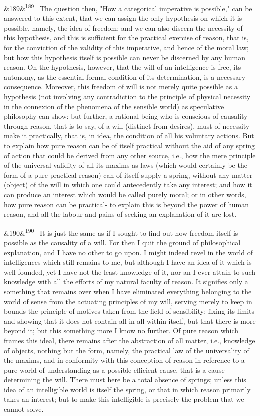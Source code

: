 \documentclass[12pt]{article}
\newcommand{\para}[1][]{\par\noindent\ifx&#1&\else\textsuperscript{\footnotesize #1}~\fi}
\begin{document}
\para[189] The question then, "How a categorical imperative is possible," can be answered to this extent, that we can assign the only hypothesis on which it is possible, namely, the idea of freedom; and we can also discern the necessity of this hypothesis, and this is sufficient for the practical exercise of reason, that is, for the conviction of the validity of this imperative, and hence of the moral law; but how this hypothesis itself is possible can never be discerned by any human reason. On the hypothesis, however, that the will of an intelligence is free, its autonomy, as the essential formal condition of its determination, is a necessary consequence. Moreover, this freedom of will is not merely quite possible as a hypothesis (not involving any contradiction to the principle of physical necessity in the connexion of the phenomena of the sensible world) as speculative philosophy can show: but further, a rational being who is conscious of causality through reason, that is to say, of a will (distinct from desires), must of necessity make it practically, that is, in idea, the condition of all his voluntary actions. But to explain how pure reason can be of itself practical without the aid of any spring of action that could be derived from any other source, i.e., how the mere principle of the universal validity of all its maxims as laws (which would certainly be the form of a pure practical reason) can of itself supply a spring, without any matter (object) of the will in which one could antecedently take any interest; and how it can produce an interest which would be called purely moral; or in other words, how pure reason can be practical- to explain this is beyond the power of human reason, and all the labour and pains of seeking an explanation of it are lost.

\para[190] It is just the same as if I sought to find out how freedom itself is possible as the causality of a will. For then I quit the ground of philosophical explanation, and I have no other to go upon. I might indeed revel in the world of intelligences which still remains to me, but although I have an idea of it which is well founded, yet I have not the least knowledge of it, nor an I ever attain to such knowledge with all the efforts of my natural faculty of reason. It signifies only a something that remains over when I have eliminated everything belonging to the world of sense from the actuating principles of my will, serving merely to keep in bounds the principle of motives taken from the field of sensibility; fixing its limits and showing that it does not contain all in all within itself, but that there is more beyond it; but this something more I know no further. Of pure reason which frames this ideal, there remains after the abstraction of all matter, i.e., knowledge of objects, nothing but the form, namely, the practical law of the universality of the maxims, and in conformity with this conception of reason in reference to a pure world of understanding as a possible efficient cause, that is a cause determining the will. There must here be a total absence of springs; unless this idea of an intelligible world is itself the spring, or that in which reason primarily takes an interest; but to make this intelligible is precisely the problem that we cannot solve.
\end{document}
